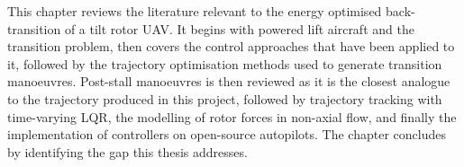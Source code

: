 This chapter reviews the literature relevant to the energy optimised back-transition of a tilt rotor UAV. It begins with powered lift aircraft and the transition problem, then covers the control approaches that have been applied to it, followed by the trajectory optimisation methods used to generate transition manoeuvres. Post-stall manoeuvres is then reviewed as it is the closest analogue to the trajectory produced in this project, followed by trajectory tracking with time-varying LQR, the modelling of rotor forces in non-axial flow, and finally the implementation of controllers on open-source autopilots. The chapter concludes by identifying the gap this thesis addresses.

